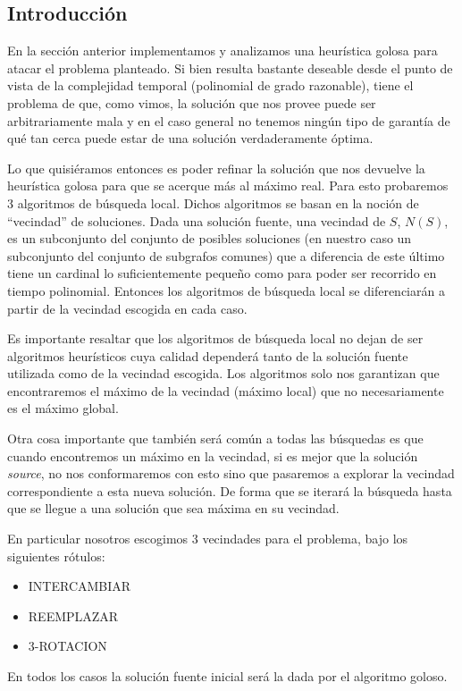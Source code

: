 \subsection{Introducción}
En la sección anterior implementamos y analizamos una heurística golosa para atacar el problema planteado. Si bien resulta bastante deseable desde el punto de vista de la complejidad temporal (polinomial de grado razonable), tiene el problema de que, como vimos, la solución que nos provee puede ser arbitrariamente mala y en el caso general no tenemos ningún tipo de garantía de qué tan cerca puede estar de una solución verdaderamente óptima.

Lo que quisiéramos entonces es poder refinar la solución que nos devuelve la heurística golosa para que se acerque más al máximo real. Para esto probaremos 3 algoritmos de búsqueda local. Dichos algoritmos se basan en la noción de ``vecindad'' de soluciones. Dada una solución fuente, una vecindad de $S$, $N(S)$, es un subconjunto del conjunto de posibles soluciones (en nuestro caso un subconjunto del conjunto de subgrafos comunes) que a diferencia de este último tiene un cardinal lo suficientemente pequeño como para poder ser recorrido en tiempo polinomial. Entonces los algoritmos de búsqueda local se diferenciarán a partir de la vecindad escogida en cada caso.

Es importante resaltar que los algoritmos de búsqueda local no dejan de ser algoritmos heurísticos cuya calidad dependerá tanto de la solución fuente utilizada como de la vecindad escogida. Los algoritmos solo nos garantizan que encontraremos el máximo de la vecindad (máximo local) que no necesariamente es el máximo global.

Otra cosa importante que también será común a todas las búsquedas es que cuando encontremos un máximo en la vecindad, si es mejor que la solución \emph{source}, no nos conformaremos con esto sino que pasaremos a explorar la vecindad correspondiente a esta nueva solución. De forma que se iterará la búsqueda hasta que se llegue a una solución que sea máxima en su vecindad.

En particular nosotros escogimos 3 vecindades para el problema, bajo los siguientes rótulos:
\begin{itemize}
	\item INTERCAMBIAR
	\item REEMPLAZAR
	\item 3-ROTACION 
\end{itemize}

En todos los casos la solución fuente inicial será la dada por el algoritmo goloso.

